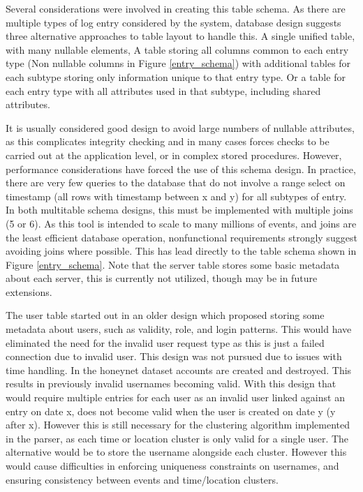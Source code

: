 Several considerations were involved in creating this table schema. As there are multiple types of log entry considered by the system, database design suggests three alternative approaches to table layout to handle this. A single unified table, with many nullable elements, A table storing all columns common to each entry type (Non nullable columns in Figure \ref{entry_schema}) with additional tables for each subtype storing only information unique to that entry type. Or a table for each entry type with all attributes used in that subtype, including shared attributes.

It is usually considered good design to avoid large numbers of nullable attributes, as this complicates integrity checking and in many cases forces checks to be carried out at the application level, or in complex stored procedures. However, performance considerations have forced the use of this schema design. In practice, there are very few queries to the database that do not involve a range select on timestamp (all rows with timestamp between x and y) for all subtypes of entry. In both multitable schema designs, this must be implemented with multiple joins (5 or 6). As this tool is intended to scale to many millions of events, and joins are the least efficient database operation, nonfunctional requirements strongly suggest avoiding joins where possible. This has lead directly to the table schema shown in Figure \ref{entry_schema}. Note that the server table stores some basic metadata about each server, this is currently not utilized, though may be in future extensions.

The user table started out in an older design which proposed storing some metadata about users, such as validity, role, and login patterns. This would have eliminated the need for the invalid user request type as this is just a failed connection due to invalid user. This design was not pursued due to issues with time handling. In the honeynet dataset accounts are created and destroyed. This results in previously invalid usernames becoming valid. With this design that would require multiple entries for each user as an invalid user linked against an entry on date x, does not become valid when the user is created on date y (y after x). However this is still necessary for the clustering algorithm implemented in the parser, as each time or location cluster is only valid for a single user. The alternative would be to store the username alongside each cluster. However this would cause difficulties in enforcing uniqueness constraints on usernames, and ensuring consistency between events and time/location clusters. 

